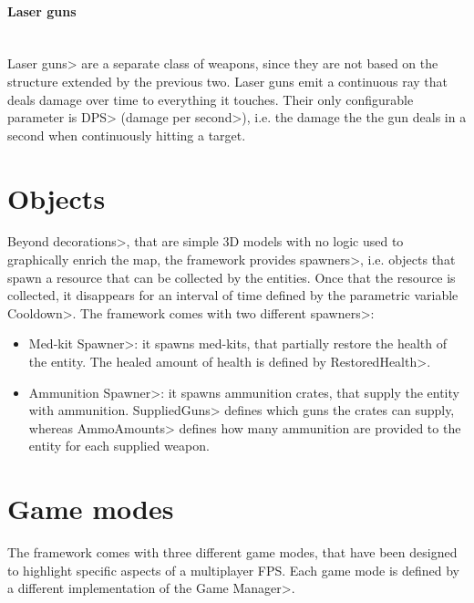 \paragraph{Laser guns}

\mbox{}\\

{\setlength{\parindent}{0cm}
\<Laser guns> are a separate class of weapons, since they are not based on the structure extended by the previous two. Laser guns emit a continuous ray that deals damage over time to everything it touches. Their only configurable parameter is \<DPS> (\<damage per second>), i.e. the damage the the gun deals in a second when continuously hitting a target.
}


\section{Objects}

Beyond \<decorations>, that are simple 3D models with no logic used to graphically enrich the map, the framework provides \<spawners>, i.e. objects that spawn a resource that can be collected by the entities. Once that the resource is collected, it disappears for an interval  of time defined by the parametric variable  \<Cooldown>. The framework comes with two different \<spawners>:

\begin{itemize}
\item \<Med-kit Spawner>: it spawns med-kits, that partially restore the health of the entity. The healed amount of health is defined by \<RestoredHealth>.
\item \<Ammunition Spawner>: it spawns ammunition crates, that supply the entity with ammunition. \<SuppliedGuns> defines which guns the crates can supply, whereas \<AmmoAmounts> defines how many ammunition are provided to the entity for each supplied weapon.

\end{itemize}


\section{Game modes}

The framework comes with three different game modes, that have been designed to highlight specific aspects of a multiplayer FPS. Each game mode is defined by a different implementation of the \<Game Manager>.

